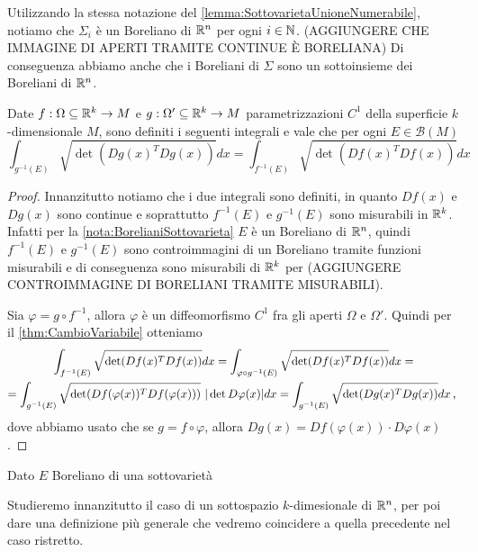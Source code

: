 \begin{remark}\label{nota:BorelianiSottovarieta}
	Utilizzando la stessa notazione del \cref{lemma:SottovarietaUnioneNumerabile}, notiamo che $\Sigma_i$ è un Boreliano di $\mathbb R^n$ per ogni $i\in\mathbb N$. (AGGIUNGERE CHE IMMAGINE DI APERTI TRAMITE CONTINUE È BORELIANA) Di conseguenza abbiamo anche che i Boreliani di $\Sigma$ sono un sottoinsieme dei Boreliani di $\mathbb R^n$.
\end{remark}


\begin{lemma}
	Date $f:\Omega\subseteq\mathbb R^k\to M$ e $g:\Omega'\subseteq\mathbb R^k\to M$ parametrizzazioni $C^1$ della superficie $k$-dimensionale $M$, sono definiti i seguenti integrali e vale che per ogni $E\in\mathcal{B}(M)$
	\begin{equation*}
		\int_{g^{-1}(E)}\sqrt{\det(Dg(x)^TDg(x))}dx=\int_{f^{-1}(E)}\sqrt{\det(Df(x)^TDf(x))}dx
	\end{equation*}
\end{lemma}
\begin{proof}
	Innanzitutto notiamo che i due integrali sono definiti, in quanto $Df(x)$ e $Dg(x)$ sono continue e soprattutto $f^{-1}(E)$ e $g^{-1}(E)$ sono misurabili in $\mathbb R^k$. Infatti per la \cref{nota:BorelianiSottovarieta} $E$ è un Boreliano di $\mathbb R^n$, quindi $f^{-1}(E)$ e $g^{-1}(E)$ sono controimmagini di un Boreliano tramite funzioni misurabili e di conseguenza sono misurabili di $\mathbb R^k$ per (AGGIUNGERE CONTROIMMAGINE DI BORELIANI TRAMITE MISURABILI). 

	Sia $\varphi=g\circ f^{-1}$, allora $\varphi$ è un diffeomorfismo $C^1$ fra gli aperti $\Omega$ e $\Omega'$. Quindi per il \cref{thm:CambioVariabile} otteniamo
	\begin{multline*}
		\int_{f^{-1}(E)}\sqrt{\det(Df(x)^TDf(x))}dx=\int_{\varphi\circ g^{-1}(E)}\sqrt{\det(Df(x)^TDf(x))}dx=\\
		=\int_{g^{-1}(E)}\sqrt{\det(Df(\varphi(x))^TDf(\varphi(x)))}\ |\det D\varphi(x)|dx=\int_{g^{-1}(E)}\sqrt{\det(Dg(x)^TDg(x))}dx\virgola
	\end{multline*}
	dove abbiamo usato che se $g=f\circ \varphi$, allora $Dg(x)=Df(\varphi(x))\cdot D\varphi(x)$.
\end{proof}

\begin{definition}
	Dato $E$ Boreliano di una sottovarietà 
\end{definition}



Studieremo innanzitutto il caso di un sottospazio $k$-dimesionale di $\mathbb R^n$, per poi dare una definizione più generale che vedremo coincidere a quella precedente nel caso ristretto.

